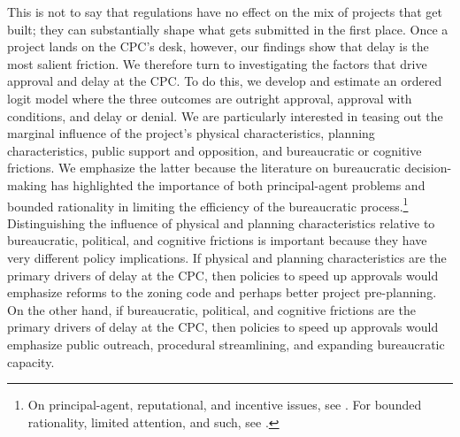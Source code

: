 This is not to say that regulations have no effect on the mix of projects that get built; they can substantially shape what gets submitted in the first place. Once a project lands on the CPC's desk, however, our findings show that delay is the most salient friction. We therefore turn to investigating the factors that drive approval and delay at the CPC. To do this, we develop and estimate an ordered logit model where the three outcomes are outright approval, approval with conditions, and delay or denial. We are particularly interested in teasing out the marginal influence of the project's physical characteristics, planning characteristics, public support and opposition, and bureaucratic or cognitive frictions. We emphasize the latter because the literature on bureaucratic decision-making has highlighted the importance of both principal-agent problems and bounded rationality in limiting the efficiency of the bureaucratic process.\footnote{On principal-agent, reputational, and incentive issues, see \citet{Dixit2002, Prendergast2003, BesleyGhatak2003, Black2008, CarpenterKrause2012, DamonteDunlopRadaelli2014, BusuiocLodge2016, MaggettiPapadopoulos2018}. For bounded rationality, limited attention, and such, see \citet{Radner1993, VanZandt1999, Sims2003, Guth2010, Salant2011, LimMatrosTurocy2014, ZhangLevin2017, deClippelRozen2021, Richters2021, HebertWoodford2023}.} Distinguishing the influence of physical and planning characteristics relative to bureaucratic, political, and cognitive frictions is important because they have very different policy implications. If physical and planning characteristics are the primary drivers of delay at the CPC, then policies to speed up approvals would emphasize reforms to the zoning code and perhaps better project pre-planning. On the other hand, if bureaucratic, political, and cognitive frictions are the primary drivers of delay at the CPC, then policies to speed up approvals would emphasize public outreach, procedural streamlining, and expanding bureaucratic capacity.

